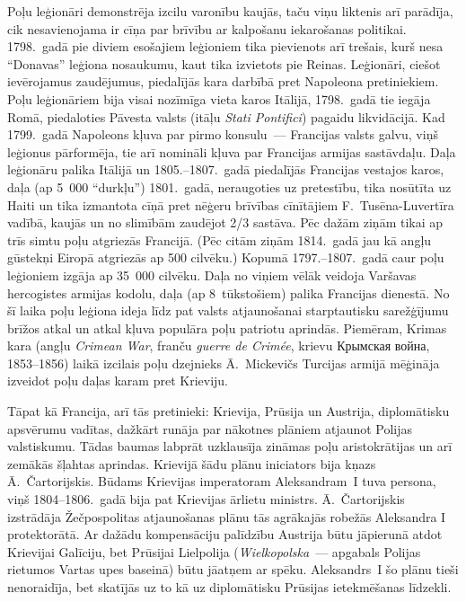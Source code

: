 \documentclass[twoside,a5paper,12pt,fleqn,openany]{extbook}
\newcommand{\pltxti}[1]{\textit{\textpolish{#1}}}
\newcommand{\rutxti}[1]{\textrussian{#1}}
\newcommand{\frtxti}[1]{\textit{\textfrench{#1}}}
\newcommand{\entxti}[1]{\textit{\textenglish{#1}}}
\newcommand{\latxti}[1]{\textit{\textlatin{#1}}}
\begin{document}
Poļu leģionāri demonstrēja izcilu varonību kaujās, taču viņu liktenis arī parādīja, cik nesavienojama ir cīņa par brīvību ar kalpošanu iekarošanas politikai. 1798.~gadā pie diviem esošajiem leģioniem tika pievienots arī trešais, kurš nesa ``Donavas'' leģiona nosaukumu, kaut tika izvietots pie Reinas. Leģionāri, ciešot ievērojamus zaudējumus, piedalījās kara darbībā pret Napoleona pretiniekiem. Poļu leģionāriem bija visai nozīmīga vieta karos Itālijā, 1798.~gadā tie iegāja Romā, piedaloties Pāvesta valsts (itāļu \latxti{Stati Pontifici}) pagaidu likvidācijā. Kad 1799.~gadā Napoleons kļuva par pirmo konsulu~--- Francijas valsts galvu, viņš leģionus pārformēja, tie arī nomināli kļuva par Francijas armijas sastāvdaļu. Daļa leģionāru palika Itālijā un 1805.--1807.~gadā piedalījās Francijas vestajos karos, daļa (ap 5~000 ``durkļu'') 1801.~gadā, neraugoties uz pretestību, tika nosūtīta uz Haiti un tika izmantota cīņā pret nēģeru brīvības cīnītājiem F.~Tusēna-Luvertīra vadībā, kaujās un no slimībām zaudējot 2/3 sastāva. Pēc dažām ziņām tikai ap trīs simtu poļu atgriezās Francijā. (Pēc citām ziņām 1814.~gadā jau kā angļu gūstekņi Eiropā atgriezās ap 500 cilvēku.) Kopumā 1797.--1807.~gadā caur poļu leģioniem izgāja ap 35~000 cilvēku. Daļa no viņiem vēlāk veidoja Varšavas hercogistes armijas kodolu, daļa (ap 8~tūkstošiem) palika Francijas dienestā. No šī laika poļu leģiona ideja līdz pat valsts atjaunošanai starptautisku sarežģījumu brīžos atkal un atkal kļuva populāra poļu patriotu aprindās. Piemēram, Krimas kara (angļu \entxti{Crimean War}, franču \frtxti{guerre de Crimée}, krievu \rutxti{Крымская война}, 1853--1856) laikā izcilais poļu dzejnieks Ā.~Mickevičs Turcijas armijā mēģināja izveidot poļu daļas karam pret Krieviju.

Tāpat kā Francija, arī tās pretinieki: Krievija, Prūsija un Austrija, diplomātisku apsvērumu vadītas, dažkārt runāja par nākotnes plāniem atjaunot Polijas valstiskumu. Tādas baumas labprāt uzklausīja zināmas poļu aristokrātijas un arī zemākās šļahtas aprindas. Krievijā šādu plānu iniciators bija kņazs Ā.~Čartorijskis. Būdams Krievijas imperatoram Aleksandram~I tuva persona, viņš 1804--1806.~gadā bija pat Krievijas ārlietu ministrs. Ā.~Čartorijskis izstrādāja Žečpospolitas atjaunošanas plānu tās agrākajās robežās Aleksandra I protektorātā. Ar dažādu kompensāciju palīdzību Austrija būtu jāpierunā atdot Krievijai Galīciju, bet Prūsijai Lielpolija (\pltxti{Wielkopolska}~--- apgabals Polijas rietumos Vartas upes baseinā) būtu jāatņem ar spēku. Aleksandrs~I šo plānu tieši nenoraidīja, bet skatījās uz to kā uz diplomātisku Prūsijas ietekmēšanas līdzekli.
\end{document}
